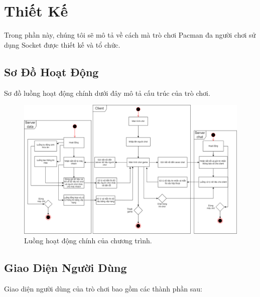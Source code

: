\documentclass[a4paper]{article}
\begin{document}
\newpage
\section{Thiết Kế}

Trong phần này, chúng tôi sẽ mô tả về cách mà trò chơi Pacman đa người chơi sử dụng Socket được thiết kế và tổ chức.

\subsection{Sơ Đồ Hoạt Động}

Sơ đồ luồng hoạt động chính dưới đây mô tả cấu trúc của trò chơi.

\begin{figure}[h!]
    \centering
    \includegraphics[width=1\linewidth]{luongHoatDongChinh.png}
    \caption{Luồng hoạt động chính của chương trình.}
\end{figure}

\subsection{Giao Diện Người Dùng}

Giao diện người dùng của trò chơi bao gồm các thành phần sau:
\newpage
\end{document}
